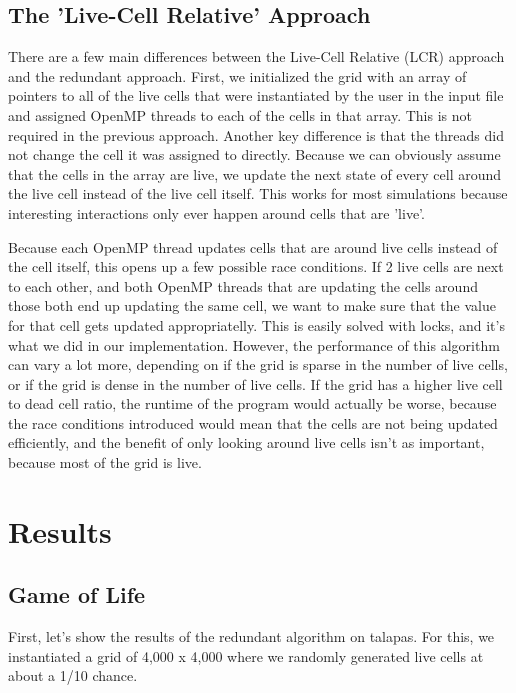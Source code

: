 \documentclass[12pt]{article}
\begin{document}
\subsection{The 'Live-Cell Relative' Approach}
There are a few main differences between the Live-Cell Relative (LCR) approach and the redundant approach. First, we initialized the grid with an array of pointers to all of the live cells that were instantiated by the user in the input file and assigned OpenMP threads to each of the cells in that array. This is not required in the previous approach. Another key difference is that the threads did not change the cell it was assigned to directly. Because we can obviously assume that the cells in the array are live, we update the next state of every cell around the live cell instead of the live cell itself. This works for most simulations because interesting interactions only ever happen around cells that are 'live'.

Because each OpenMP thread updates cells that are around live cells instead of the cell itself, this opens up a few possible race conditions. If 2 live cells are next to each other, and both OpenMP threads that are updating the cells around those both end up updating the same cell, we want to make sure that the value for that cell gets updated appropriatelly. This is easily solved with locks, and it's what we did in our implementation. However, the performance of this algorithm can vary a lot more, depending on if the grid is sparse in the number of live cells, or if the grid is dense in the number of live cells. If the grid has a higher live cell to dead cell ratio, the runtime of the program would actually be worse, because the race conditions introduced would mean that the cells are not being updated efficiently, and the benefit of only looking around live cells isn't as important, because most of the grid is live.

\section{Results}

\subsection{Game of Life}
First, let's show the results of the redundant algorithm on talapas. For this, we instantiated a grid of 4,000 x 4,000 where we randomly generated live cells at about a 1/10 chance.
\end{document}
